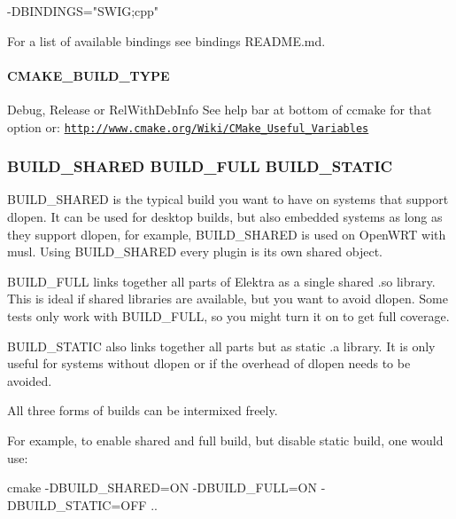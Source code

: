 \begin{DoxyCode}
-DBINDINGS="SWIG;cpp"
\end{DoxyCode}


For a list of available bindings see binding\textquotesingle{}s R\+E\+A\+D\+ME.md.

\paragraph*{{\ttfamily C\+M\+A\+K\+E\+\_\+\+B\+U\+I\+L\+D\+\_\+\+T\+Y\+PE}}

{\ttfamily Debug}, {\ttfamily Release} or {\ttfamily Rel\+With\+Deb\+Info} See help bar at bottom of {\ttfamily ccmake} for that option or\+: \href{http://www.cmake.org/Wiki/CMake_Useful_Variables}{\tt http\+://www.\+cmake.\+org/\+Wiki/\+C\+Make\+\_\+\+Useful\+\_\+\+Variables}

\subsubsection*{{\ttfamily B\+U\+I\+L\+D\+\_\+\+S\+H\+A\+R\+ED B\+U\+I\+L\+D\+\_\+\+F\+U\+LL B\+U\+I\+L\+D\+\_\+\+S\+T\+A\+T\+IC}}

{\ttfamily B\+U\+I\+L\+D\+\_\+\+S\+H\+A\+R\+ED} is the typical build you want to have on systems that support {\ttfamily dlopen}. It can be used for desktop builds, but also embedded systems as long as they support {\ttfamily dlopen}, for example, {\ttfamily B\+U\+I\+L\+D\+\_\+\+S\+H\+A\+R\+ED} is used on Open\+W\+RT with {\ttfamily musl}. Using {\ttfamily B\+U\+I\+L\+D\+\_\+\+S\+H\+A\+R\+ED} every plugin is its own shared object.

{\ttfamily B\+U\+I\+L\+D\+\_\+\+F\+U\+LL} links together all parts of Elektra as a single shared {\ttfamily .so} library. This is ideal if shared libraries are available, but you want to avoid {\ttfamily dlopen}. Some tests only work with {\ttfamily B\+U\+I\+L\+D\+\_\+\+F\+U\+LL}, so you might turn it on to get full coverage.

{\ttfamily B\+U\+I\+L\+D\+\_\+\+S\+T\+A\+T\+IC} also links together all parts but as static {\ttfamily .a} library. It is only useful for systems without {\ttfamily dlopen} or if the overhead of {\ttfamily dlopen} needs to be avoided.

All three forms of builds can be intermixed freely.

For example, to enable shared and full build, but disable static build, one would use\+:


\begin{DoxyCode}
cmake -DBUILD\_SHARED=ON -DBUILD\_FULL=ON -DBUILD\_STATIC=OFF ..
\end{DoxyCode}


